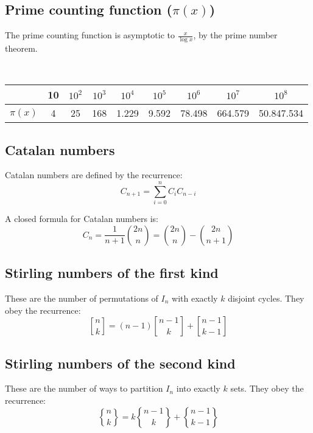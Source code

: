 \documentclass[a4paper]{amsart}
\newcommand{\stirlingfirst}[2]{\genfrac{[}{]}{0pt}{}{#1}{#2}}
\newcommand{\stirlingsecond}[2]{\genfrac{\{}{\}}{0pt}{}{#1}{#2}}
\begin{document}
  \begin{multicols}{2}
    \subsection{Prime counting function ($\pi(x)$)} The prime counting function is asymptotic to $\frac{x}{\log x}$, by the prime number theorem.

      \ 

      \begin{tabular}{|c|c|c|c|c|c|c|c|c|}
        \hline 
                  & 10 & $10^2$ & $10^3$ & $10^4$ & $10^5$ & $10^6$ & $10^7$ & $10^8$\\ \hline
          $\pi(x)$&  4 &   25 & 168 & 1.229 & 9.592 & 78.498 & 664.579 & 50.847.534\\ \hline
      \end{tabular}

    \subsection{Catalan numbers} Catalan numbers are defined by the recurrence:
      \begin{equation*}
        C_{n+1} = \sum_{i=0}^nC_iC_{n-i}
      \end{equation*}

      A closed formula for Catalan numbers is:
      \begin{equation*}
        C_n = \frac{1}{n+1}\binom{2n}{n} = \binom{2n}{n} - \binom{2n}{n+1}
      \end{equation*}

    \subsection{Stirling numbers of the first kind} These are the number of permutations of $I_n$ with exactly $k$ disjoint cycles. They obey the recurrence:
      \begin{equation*}
        \stirlingfirst{n}{k} = (n-1)\stirlingfirst{n-1}{k} + \stirlingfirst{n-1}{k-1}
      \end{equation*}

    \subsection{Stirling numbers of the second kind} These are the number of ways to partition $I_n$ into exactly $k$ sets. They obey the recurrence:
      \begin{equation*}
        \stirlingsecond{n}{k} = k\stirlingsecond{n-1}{k} + \stirlingsecond{n-1}{k-1}
      \end{equation*}


\end{multicols}
\end{document}

